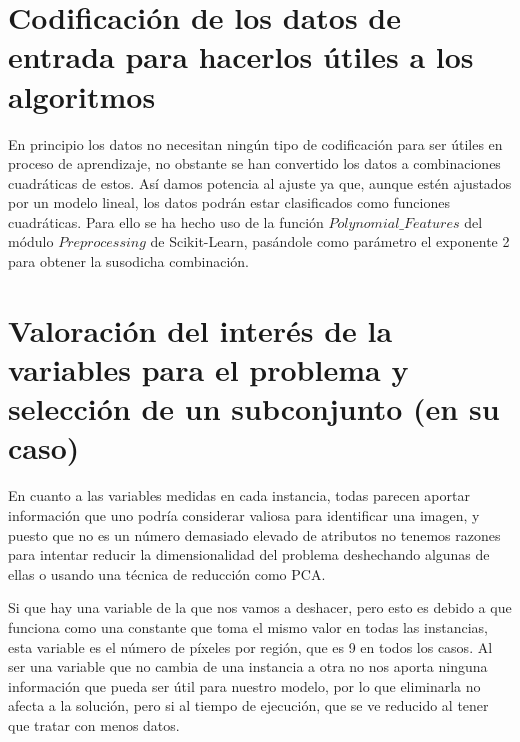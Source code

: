 \documentclass{article}
\begin{document}
	
	
	\section{Codificación de los datos de entrada para hacerlos útiles a los algoritmos} %
	
	
	En principio los datos no necesitan ningún tipo de codificación para ser útiles en proceso de aprendizaje, no obstante se han convertido los datos a combinaciones cuadráticas de estos. Así damos potencia al ajuste ya que, aunque estén ajustados por un modelo lineal, los datos podrán estar clasificados como funciones cuadráticas. Para ello se ha hecho uso de la función $Polynomial\_Features$ del módulo $Preprocessing$ de Scikit-Learn, pasándole como parámetro el exponente 2 para obtener la susodicha combinación.
	
	
	\section{Valoración del interés de la variables para el problema y selección de un subconjunto (en su caso)} %
	
En cuanto a las variables medidas en cada instancia, todas parecen aportar información que uno podría considerar valiosa para identificar una imagen, y puesto que no es un número demasiado elevado de atributos no tenemos razones para intentar reducir la dimensionalidad del problema deshechando algunas de ellas o usando una técnica de reducción como PCA.
\par 
Si que hay una variable de la que nos vamos a deshacer, pero esto es debido a que funciona como una constante que toma el mismo valor en todas las instancias, esta variable es el número de píxeles por región, que es 9 en todos los casos. Al ser una variable que no cambia de una instancia a otra no nos aporta ninguna información que pueda ser útil para nuestro modelo, por lo que eliminarla no afecta a la solución, pero si al tiempo de ejecución, que se ve reducido al tener que tratar con menos datos.
	
\end{document}
